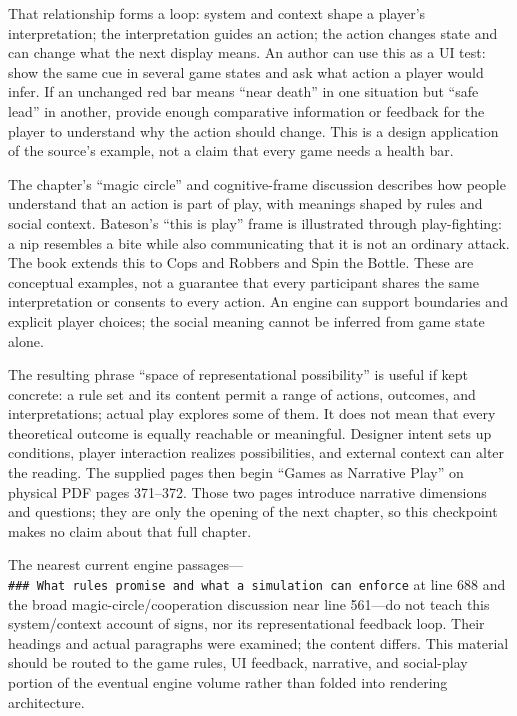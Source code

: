 That relationship forms a loop: system and context shape a player's interpretation; the interpretation guides an action; the action changes state and can change what the next display means. An author can use this as a UI test: show the same cue in several game states and ask what action a player would infer. If an unchanged red bar means ``near death'' in one situation but ``safe lead'' in another, provide enough comparative information or feedback for the player to understand why the action should change. This is a design application of the source's example, not a claim that every game needs a health bar.

The chapter's ``magic circle'' and cognitive-frame discussion describes how people understand that an action is part of play, with meanings shaped by rules and social context. Bateson's ``this is play'' frame is illustrated through play-fighting: a nip resembles a bite while also communicating that it is not an ordinary attack. The book extends this to Cops and Robbers and Spin the Bottle. These are conceptual examples, not a guarantee that every participant shares the same interpretation or consents to every action. An engine can support boundaries and explicit player choices; the social meaning cannot be inferred from game state alone.

The resulting phrase ``space of representational possibility'' is useful if kept concrete: a rule set and its content permit a range of actions, outcomes, and interpretations; actual play explores some of them. It does not mean that every theoretical outcome is equally reachable or meaningful. Designer intent sets up conditions, player interaction realizes possibilities, and external context can alter the reading. The supplied pages then begin ``Games as Narrative Play'' on physical PDF pages 371--372. Those two pages introduce narrative dimensions and questions; they are only the opening of the next chapter, so this checkpoint makes no claim about that full chapter.

The nearest current engine passages---\texttt{\#\#\#\ What\ rules\ promise\ and\ what\ a\ simulation\ can\ enforce} at line 688 and the broad magic-circle/cooperation discussion near line 561---do not teach this system/context account of signs, nor its representational feedback loop. Their headings and actual paragraphs were examined; the content differs. This material should be routed to the game rules, UI feedback, narrative, and social-play portion of the eventual engine volume rather than folded into rendering architecture.

